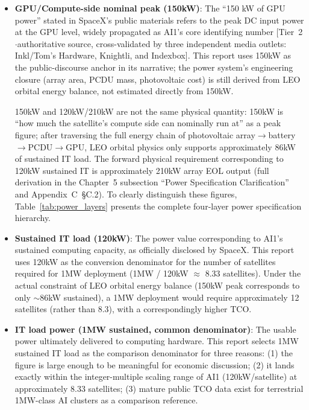\begin{itemize}[leftmargin=*]
    \item \textbf{GPU/Compute-side nominal peak (150\;kW)}: The ``150 kW of GPU power'' stated in SpaceX's public materials refers to the peak DC input power at the GPU level, widely propagated as AI1's core identifying number [Tier~2$\cdot$authoritative source, cross-validated by three independent media outlets: Inkl/Tom's Hardware, Knightli, and Indexbox]\cite{spacex2026ai1}. This report uses 150\;kW as the public-discourse anchor in its narrative; the power system's engineering closure (array area, PCDU mass, photovoltaic cost) is still derived from LEO orbital energy balance, not estimated directly from 150\;kW.

          150\;kW and 120\;kW/210\;kW are not the same physical quantity: 150\;kW is ``how much the satellite's compute side can nominally run at'' as a peak figure; after traversing the full energy chain of photovoltaic array$\to$battery$\to$PCDU$\to$GPU, LEO orbital physics only supports approximately 86\;kW of sustained IT load. The forward physical requirement corresponding to 120\;kW sustained IT is approximately 210\;kW array EOL output (full derivation in the Chapter~5 subsection ``Power Specification Clarification'' and Appendix~C~\S C.2). To clearly distinguish these figures, Table~\ref{tab:power_layers} presents the complete four-layer power specification hierarchy.
    \item \textbf{Sustained IT load (120\;kW)}: The power value corresponding to AI1's sustained computing capacity, as officially disclosed by SpaceX\cite{spacex2026ai1}. This report uses 120\;kW as the conversion denominator for the number of satellites required for 1\;MW deployment (1\;MW / 120\;kW $\approx$ 8.33 satellites). Under the actual constraint of LEO orbital energy balance (150\;kW peak corresponds to only $\sim$86\;kW sustained), a 1\;MW deployment would require approximately 12 satellites (rather than 8.3), with a correspondingly higher TCO.
    \item \textbf{IT load power (1\;MW sustained, common denominator)}: The usable power ultimately delivered to computing hardware. This report selects 1\;MW sustained IT load as the comparison denominator for three reasons: (1) the figure is large enough to be meaningful for economic discussion; (2) it lands exactly within the integer-multiple scaling range of AI1 (120\;kW/satellite) at approximately 8.33 satellites; (3) mature public TCO data exist for terrestrial 1\;MW-class AI clusters as a comparison reference.
\end{itemize}

